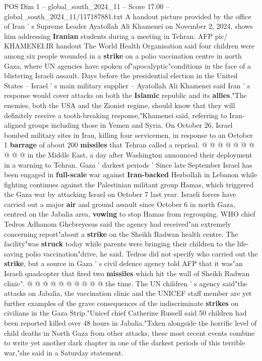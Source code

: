 \begin{textsample}{POS Dim 1 – global\_south\_2024\_11 – Score 17.00 – global\_south\_2024\_11/117187881.txt}  \label{ex:f1_pos_180}
A handout picture provided by the office of Iran ' s Supreme Leader Ayatollah Ali Khamenei on November 2, 2024, shows him addressing \textbf{Iranian} students during a meeting in Tehran.
AFP pic/ KHAMENEI.IR handout The World Health Organisation said four children were among six people wounded in a \textbf{strike} on a polio vaccination centre in north Gaza, where UN agencies have spoken of"apocalyptic"conditions in the face of a blistering Israeli assault.
Days before the presidential election in the United States -- Israel ' s main military supplier -- Ayatollah Ali Khamenei said Iran ' s response would cover attacks on both the \textbf{Islamic} republic and its \textbf{allies}."The enemies, both the USA and the Zionist regime, should know that they will definitely receive a tooth-breaking response,"Khamenei said, referring to Iran-aligned groups including those in Yemen and Syria.
On October 26, Israel bombed military sites in Iran, killing four servicemen, in response to an October 1 \textbf{barrage} of about 200 \textbf{missiles} that Tehran called a reprisal. @ @ @ @ @ @ @ @ @ @ in the Middle East, a day after Washington announced their deployment in a warning to Tehran.
Gaza ' darkest periods ' Since late September Israel has been engaged in \textbf{full-scale} war against \textbf{Iran-backed} Hezbollah in Lebanon while fighting continues against the Palestinian militant group Hamas, which triggered the Gaza war by attacking Israel on October 7 last year.
Israeli forces have carried out a major \textbf{air} and ground assault since October 6 in north Gaza, centred on the Jabalia area, \textbf{vowing} to stop Hamas from regrouping.
WHO chief Tedros Adhanom Ghebreyesus said the agency had received"an extremely concerning report"about a \textbf{strike} on the Sheikh Radwan health centre.
The facility"was \textbf{struck} today while parents were bringing their children to the life-saving polio vaccination"drive, he said.
Tedros did not specify who carried out the \textbf{strike}, but a source in Gaza ' s civil defence agency told AFP that it was"an Israeli quadcopter that fired two \textbf{missiles} which hit the wall of Sheikh Radwan clinic". @ @ @ @ @ @ @ @ @ @ the time.
The UN children ' s agency said"the attacks on Jabalia, the vaccination clinic and the UNICEF staff member are yet further examples of the grave consequences of the indiscriminate \textbf{strikes} on civilians in the Gaza Strip."Unicef chief Catherine Russell said 50 children had been reported killed over 48 hours in Jabalia."Taken alongside the horrific level of child deaths in North Gaza from other attacks, these most recent events combine to write yet another dark chapter in one of the darkest periods of this terrible war,"she said in a Saturday statement.

\end{textsample}
